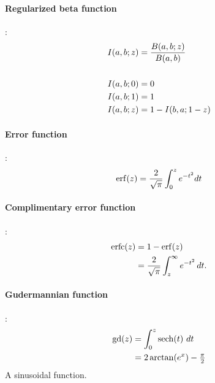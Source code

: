 \paragraph*{Regularized beta function}\hspace{-0.8em}:
\label{RegBeta}
\begin{align*}
I(a,b;z) & = \frac{B(a,b;z)}{B(a,b)}				
\\
\\ I(a,b;0) & = 0 							
\\ I(a,b;1) & = 1 							
\\ I(a,b;z) & = 1 - I(b,a;1-z)					
\end{align*}





\paragraph*{Error function}\hspace{-0.8em}\cite{Abramowitz1965}:
\begin{align*}
\operatorname{erf}(z) = \frac{2}{\sqrt{\pi}}\int_0^z e^{-t^2} dt		
\end{align*}


\paragraph*{Complimentary error function}\hspace{-0.8em}\cite{Abramowitz1965}:
\begin{align*}
             \operatorname{erfc}(z) & = 1-\operatorname{erf}(z) 		 \\
                                    & = \frac{2}{\sqrt{\pi}} \int_z^{\infty} e^{-t^2}\,dt. 
\end{align*}


\paragraph*{Gudermannian function}\hspace{-0.8em}\cite{Abramowitz1965}:
\begin{align*}
\operatorname{gd}(z) & = \int_0^{z} \operatorname{sech}(t)\  dt 				 \\			
& = 2 \arctan(e^x) - \tfrac{\pi}{2}					
\end{align*}
A sinusoidal function. 

